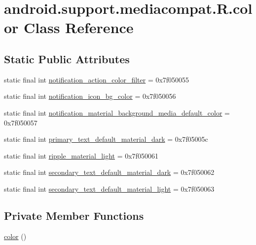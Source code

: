 \hypertarget{classandroid_1_1support_1_1mediacompat_1_1_r_1_1color}{}\section{android.\+support.\+mediacompat.\+R.\+color Class Reference}
\label{classandroid_1_1support_1_1mediacompat_1_1_r_1_1color}
\subsection*{Static Public Attributes}
\begin{DoxyCompactItemize}
\item 
static final int \mbox{\hyperlink{classandroid_1_1support_1_1mediacompat_1_1_r_1_1color_af7b049d06f32f58f426d2c3ca224e105}{notification\+\_\+action\+\_\+color\+\_\+filter}} = 0x7f050055
\item 
static final int \mbox{\hyperlink{classandroid_1_1support_1_1mediacompat_1_1_r_1_1color_a042897e29a450c630006ddda1c0c106c}{notification\+\_\+icon\+\_\+bg\+\_\+color}} = 0x7f050056
\item 
static final int \mbox{\hyperlink{classandroid_1_1support_1_1mediacompat_1_1_r_1_1color_a672cf80ae7812b859bcb839cc1b6f10e}{notification\+\_\+material\+\_\+background\+\_\+media\+\_\+default\+\_\+color}} = 0x7f050057
\item 
static final int \mbox{\hyperlink{classandroid_1_1support_1_1mediacompat_1_1_r_1_1color_a5474a7700d6c581c0abbfb09bf42e5eb}{primary\+\_\+text\+\_\+default\+\_\+material\+\_\+dark}} = 0x7f05005c
\item 
static final int \mbox{\hyperlink{classandroid_1_1support_1_1mediacompat_1_1_r_1_1color_a6cf894c1ec0271594327d322d9bf00bd}{ripple\+\_\+material\+\_\+light}} = 0x7f050061
\item 
static final int \mbox{\hyperlink{classandroid_1_1support_1_1mediacompat_1_1_r_1_1color_a39c9f3c00795c0b48c578aa9504b0c82}{secondary\+\_\+text\+\_\+default\+\_\+material\+\_\+dark}} = 0x7f050062
\item 
static final int \mbox{\hyperlink{classandroid_1_1support_1_1mediacompat_1_1_r_1_1color_a300f378d96501458fb9fd01e2f4ea7aa}{secondary\+\_\+text\+\_\+default\+\_\+material\+\_\+light}} = 0x7f050063
\end{DoxyCompactItemize}
\subsection*{Private Member Functions}
\begin{DoxyCompactItemize}
\item 
\mbox{\hyperlink{classandroid_1_1support_1_1mediacompat_1_1_r_1_1color_aa885455117f55a486de8ab9af3791a80}{color}} ()
\end{DoxyCompactItemize}


